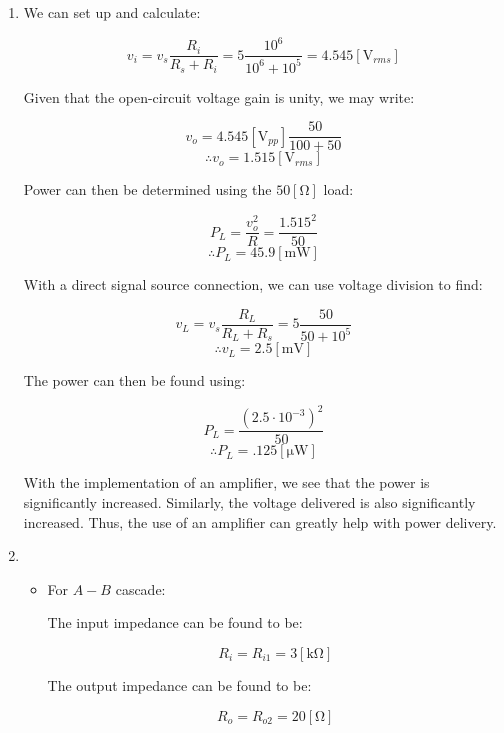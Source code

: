 \begin{enumerate}

  \item

    \begin{center}
      We can set up and calculate:
    \end{center}
    $$v_i=v_s\frac{R_i}{R_s+R_i}=5\frac{10^6}{10^6+10^5}=4.545[\si{\volt}_{rms}]$$
    \begin{center}
      Given that the open-circuit voltage gain is unity, we may write:
    \end{center}
    $$v_o=4.545[\si{\volt}_{pp}]\frac{50}{100+50}$$
    $$\boxed{\therefore v_o=1.515[\si{\volt}_{rms}]}$$

    \begin{center}
      Power can then be determined using the $50[\si{\ohm}]$ load:
    \end{center}
    $$P_L=\frac{v_o^2}{R}=\frac{1.515^2}{50}$$
    $$\boxed{\therefore P_L=45.9[\si{\milli\watt}]}$$

    \begin{center}
      With a direct signal source connection, we can use voltage division to find:
    \end{center}
    $$v_L=v_s\frac{R_L}{R_L+R_s}=5\frac{50}{50+10^5}$$
    $$\boxed{\therefore v_L=2.5[\si{\milli\volt}]}$$

    \begin{center}
      The power can then be found using:
    \end{center}
    $$P_L=\frac{(2.5\cdot10^{-3})^2}{50}$$
    $$\boxed{\therefore P_L=.125[\si{\micro\watt}]}$$

    With the implementation of an amplifier, we see that the power is significantly increased. Similarly, the voltage delivered is also significantly increased. Thus, the use of an amplifier can greatly help with power delivery.

  \item

    \begin{itemize}

      \item For $A-B$ cascade:
        
        \begin{center}
          The input impedance can be found to be:
        \end{center}
        $$\boxed{R_i=R_{i1}=3[\si{\kilo\ohm}]}$$

        \begin{center}
          The output impedance can be found to be:
        \end{center}
        $$\boxed{R_o=R_{o2}=20[\si{\ohm}]}$$


\end{itemize}
\end{enumerate}
